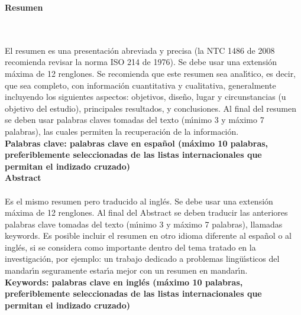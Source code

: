 \newpage{\pagestyle{empty}\cleardoublepage}

\newpage

\textbf{\LARGE Resumen}
\\\\
El resumen es una presentaci\'{o}n abreviada y precisa (la NTC 1486 de 2008 recomienda revisar la norma ISO 214 de 1976). Se debe usar una extensi\'{o}n m\'{a}xima de 12 renglones. Se recomienda que este resumen sea anal\'{\i}tico, es decir, que sea completo, con informaci\'{o}n cuantitativa y cualitativa, generalmente incluyendo los siguientes aspectos: objetivos, dise\~{n}o, lugar y circunstancias (u objetivo del estudio), principales resultados, y conclusiones. Al final del resumen se deben usar palabras claves tomadas del texto (m\'{\i}nimo 3 y m\'{a}ximo 7 palabras), las cuales permiten la recuperaci\'{o}n de la informaci\'{o}n.\\[0.5cm]
\textbf{\small Palabras clave: palabras clave en espa\~{n}ol (m\'{a}ximo 10 palabras, preferiblemente seleccionadas de las listas internacionales que permitan el indizado cruzado)}\\[1cm]

\textbf{\LARGE Abstract}\\\\
Es el mismo resumen pero traducido al ingl\'{e}s. Se debe usar una extensi\'{o}n m\'{a}xima de 12 renglones. Al final del Abstract se deben traducir las anteriores palabras clave tomadas del texto (m\'{\i}nimo 3 y m\'{a}ximo 7 palabras), llamadas keywords. Es posible incluir el resumen en otro idioma diferente al espa\~{n}ol o al ingl\'{e}s, si se considera como importante dentro del tema tratado en la investigaci\'{o}n, por ejemplo: un trabajo dedicado a problemas ling\"{u}\'{\i}sticos del mandar\'{\i}n seguramente estar\'{\i}a mejor con un resumen en mandar\'{\i}n.\\[0.5cm]
\textbf{\small Keywords: palabras clave en ingl\'{e}s (m\'{a}ximo 10 palabras, preferiblemente seleccionadas de las listas internacionales que permitan el indizado cruzado)}\\

\newpage{\pagestyle{empty}\cleardoublepage}